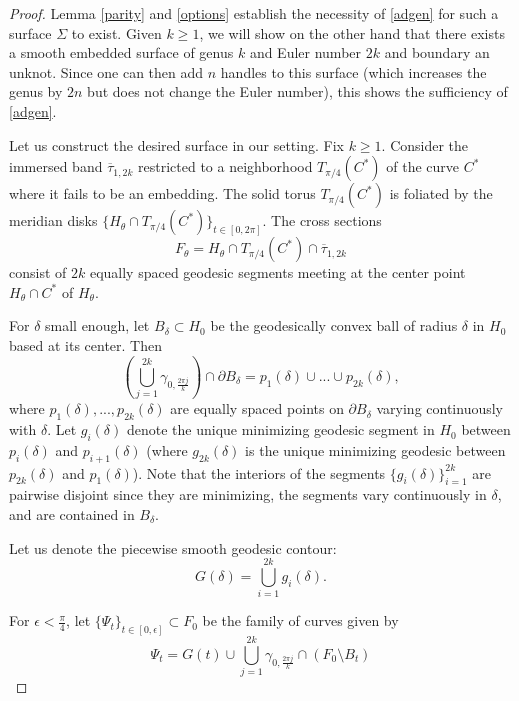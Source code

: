 \documentclass[11pt, reqno]{amsart}
\numberwithin{equation}{section}
\begin{document}
\begin{proof}
Lemma \ref{parity} and \eqref{options} establish the necessity of \eqref{adgen} for such a surface $\Sigma$ to exist.  Given $k\geq 1$, we will show on the other hand that there exists a smooth embedded surface of genus $k$ and Euler number $2k$ and boundary an unknot.  Since one can then add $n$ handles to this surface (which increases the genus by $2n$ but does not change the Euler number), this shows the sufficiency of \eqref{adgen}.

Let us construct the desired surface in our setting.  Fix $k\geq 1$. Consider the immersed band $\overline{\tau}_{1,2k}$ restricted to a neighborhood $T_{\pi/4}(C^*)$ of the curve $C^*$ where it fails to be an embedding.  The solid torus $T_{\pi/4}(C^*)$ is foliated by the meridian disks $\{H_\theta\cap  T_{\pi/4}(C^*)\}_{t\in [0,2\pi]}$.  The cross sections \begin{equation}F_\theta = H_\theta\cap T_{\pi/4}(C^*)\cap \overline{\tau}_{1,2k}\end{equation} consist of $2k$ equally spaced geodesic segments meeting at the center point $H_\theta\cap C^*$ of $H_\theta$.  

For $\delta$ small enough, let $B_\delta\subset H_0$ be the geodesically convex ball of radius $\delta$ in $H_0$ based at its center.  Then 
\begin{equation}
(\bigcup_{j=1}^{2k} \gamma_{0,\frac{2\pi j}{k}})\cap \partial B_\delta = p_1(\delta)\cup...\cup p_{2k}(\delta), 
\end{equation}
where $p_1(\delta),...,p_{2k}(\delta)$ are equally spaced points on $\partial B_\delta$ varying continuously with $\delta$.
Let $g_i(\delta)$ denote the unique minimizing geodesic segment in $H_0$ between $p_i(\delta)$ and $p_{i+1}(\delta)$ (where $g_{2k}(\delta)$ is the unique minimizing geodesic between $p_{2k}(\delta)$ and $p_1(\delta)$).  Note that the interiors of the segments $\{g_i(\delta)\}_{i=1}^{2k}$ are pairwise disjoint since they are minimizing, the segments vary continuously in $\delta$, and are contained in $B_\delta$.

Let us denote the piecewise smooth geodesic contour:
\begin{equation}
G(\delta) = \bigcup_{i=1}^{2k} g_i(\delta).
\end{equation}


For $\epsilon<\frac{\pi}{4}$, let  $\{\Psi_t\}_{t\in [0,\epsilon]}\subset F_0$ be the family of curves given by 
\begin{equation}
\Psi_t = G(t)\cup \bigcup_{j=1}^{2k} \gamma_{0,\frac{2\pi j}{k}}\cap (F_0\setminus B_t) 
\end{equation}


\end{proof}
\end{document}
